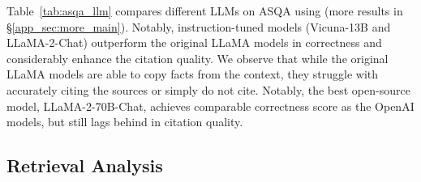 \documentclass[11pt]{article}
\newcommand{\vani}{{\sc{Vanilla}}}
\newcommand{\revise}[1]{{{#1}}}
\begin{document}
Table~\ref{tab:asqa_llm} compares 
different LLMs on ASQA using \vani{} (more results  in \S\ref{app_sec:more_main}).
Notably, instruction-tuned models (Vicuna-13B and LLaMA-2-Chat)
outperform the original LLaMA models in correctness and 
considerably enhance the citation quality.
We observe that 
while the original LLaMA models are able to %
copy facts from the context,
they struggle with accurately citing the sources or simply do not cite. 
\revise{Notably, the best open-source model, LLaMA-2-70B-Chat, achieves comparable correctness score as the OpenAI models, but still lags behind in citation quality. }





\subsection{Retrieval Analysis}


\end{document}
